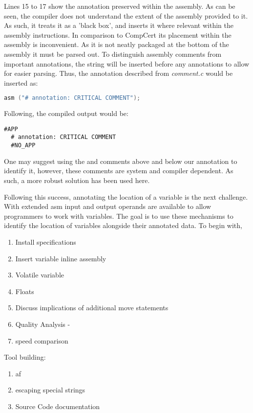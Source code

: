 Lines 15 to 17 show the annotation preserved within the assembly. As can be seen, the compiler does not understand the extent of the assembly provided to it. As such, it treats it as a 'black box', and inserts it where relevant within the assembly instructions. In comparison to CompCert its placement within the assembly is inconvenient. As it is not neatly packaged at the bottom of the assembly it must be parsed out. To distinguish assembly comments from important annotations, the string  will be inserted before any annotations to allow for easier parsing. Thus, the annotation described from \textit{comment.c} would be inserted as:

\begin{lstlisting}[firstnumber=2, language=C]
    asm ("# annotation: CRITICAL COMMENT");
\end{lstlisting}

Following, the compiled output would be:
\begin{lstlisting}[firstnumber=15]
  #APP
  # annotation: CRITICAL COMMENT
  #NO_APP
\end{lstlisting}

One may suggest using the  and  comments above and below our annotation to identify it, however, these comments are system and compiler dependent. As such, a more robust solution has been used here.

Following this success, annotating the location of a variable is the next challenge. With extended asm input and output operands are available to allow programmers to work with variables. The goal is to use these mechanisms to identify the location of variables alongside their annotated data. To begin with, 


\begin{enumerate}
    \item Install specifications
    \item Insert variable inline assembly
    \item Volatile variable
    \item Floats
    \item Discuss implications of additional move statements
    \item Quality Analysis -
    \item speed comparison
\end{enumerate}

Tool building:
\begin{enumerate}
    \item af
    \item escaping special strings
    \item Source Code documentation
\end{enumerate}


